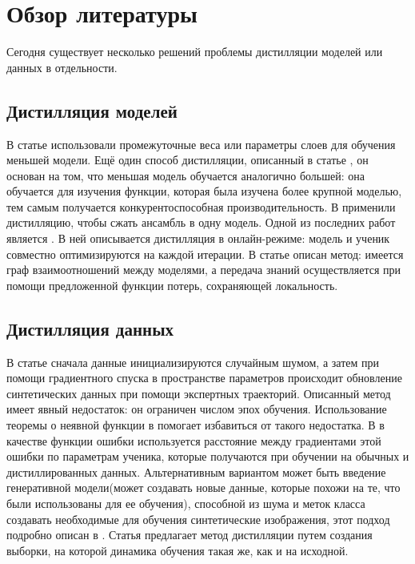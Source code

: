 \documentclass[12pt]{article}
\begin{document}
\section{Обзор литературы}

 Сегодня существует несколько решений проблемы дистилляции моделей или данных в отдельности. 


\subsection{Дистилляция моделей}
В статье \cite{romero2014fitnets} использовали промежуточные веса или параметры слоев для обучения меньшей модели. Ещё один способ дистилляции, описанный в статье \cite{ba2014deep}, он основан на том, что меньшая модель обучается аналогично большей: она обучается
для изучения функции, которая была изучена более крупной моделью, тем самым получается конкурентоспособная производительность. В \cite{hinton2015distilling} применили дистилляцию, чтобы сжать ансамбль в одну модель. Одной из последних работ является \cite{chung2020feature}. В ней описывается дистилляция в онлайн-режиме: модель и ученик совместно оптимизируются на каждой итерации. В статье \cite{chen2021learning} описан метод: имеется граф взаимоотношений между моделями, а передача знаний осуществляется при помощи предложенной функции потерь, сохраняющей локальность.




\subsection{Дистилляция данных}
В статье \cite{wang2018dataset} сначала данные инициализируются случайным шумом, а затем при помощи градиентного спуска в пространстве параметров происходит обновление синтетических данных при помощи экспертных траекторий. Описанный метод имеет явный недостаток: он ограничен числом эпох обучения. Использование теоремы о неявной функции в \cite{lorraine2020optimizing} помогает избавиться от такого недостатка. В \cite{zhao2020dataset} в качестве функции ошибки используется расстояние между градиентами этой ошибки по параметрам ученика, которые получаются при обучении на обычных и дистиллированных данных. Альтернативным вариантом может быть введение генеративной модели(может создавать новые данные, которые похожи на те, что были использованы для ее обучения), способной из шума и меток класса создавать необходимые для обучения синтетические изображения, этот подход подробно описан в \cite{such2020generative}.
Статья \cite{cazenavette2022dataset} предлагает метод дистилляции путем создания выборки, на которой динамика обучения такая же, как и на исходной.
\end{document}
